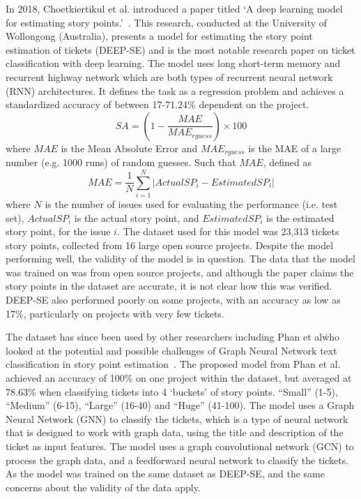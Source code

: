 \documentclass{UoYCSproject}
\begin{document}
    In 2018, Choetkiertikul et al.
    introduced a paper titled `A deep learning model for estimating story points.'~\cite{8255666}.
    This research, conducted at the University of Wollongong (Australia), presents a model for estimating the story point estimation of tickets (DEEP-SE) and is the most notable research paper on ticket classification with deep learning.
    The model uses long short-term memory and recurrent highway network which are both types of recurrent neural network (RNN) architectures.
    It defines the task as a regression problem and achieves a standardized accuracy of between 17-71.24\% dependent on the project.
    \[SA = (1-\frac{MAE}{MAE_{rguess}}) \times 100\]
    where $MAE$ is the Mean Absolute Error and $MAE_{rguess}$ is the MAE of a large number (e.g. 1000 runs) of random guesses. Such that $MAE$, defined as \[ MAE = \frac{1}{N}\sum_{i=1}^{N}|ActualSP_{i} - EstimatedSP_{i}|\] where $N$ is the number of issues used for evaluating the performance (i.e. test set), $ActualSP_i$ is the actual story point, and $EstimatedSP_i$ is the estimated story point, for the issue $i$.
    The dataset used for this model was 23,313 tickets story points, collected from 16 large open source projects.
    Despite the model performing well, the validity of the model is in question. The data that the model was trained on was from open source projects, and although the paper claims the story points in the dataset are accurate, it is not clear how this was verified. DEEP-SE also performed poorly on some projects, with an accuracy as low as 17\%, particularly on projects with very few tickets.

    The dataset has since been used by other researchers including Phan et al\. who looked at the potential and possible challenges of Graph Neural Network text
    classification in story point estimation~\cite{phan2022story}.
    The proposed model from Phan et al. achieved an accuracy of 100\% on one project within the dataset, but averaged at 78.63\% when classifying tickets into 4 `buckets' of story points. ``Small'' (1-5), ``Medium'' (6-15), ``Large'' (16-40) and ``Huge'' (41-100).
    The model uses a Graph Neural Network (GNN) to classify the tickets, which is a type of neural network that is designed to work with graph data, using the title and description of the ticket as input features. The model uses a graph convolutional network (GCN) to process the graph data, and a feedforward neural network to classify the tickets.
    As the model was trained on the same dataset as DEEP-SE, and the same concerns about the validity of the data apply.
\end{document}
